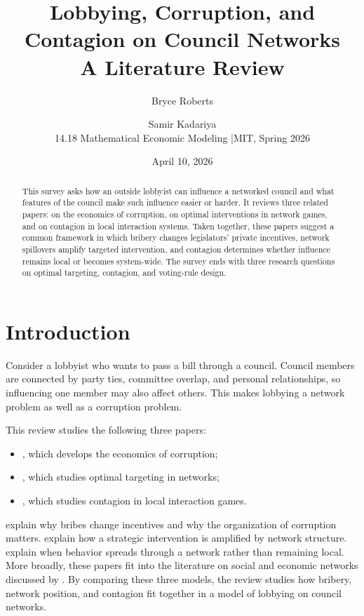 \documentclass[11pt,letterpaper]{article}
\title{\textbf{Lobbying, Corruption, and Contagion on Council Networks}\\{\small \textbf{A Literature Review}}}
\author{Bryce Roberts  \and Samir Kadariya \\[0.5em]
\small 14.18 Mathematical Economic Modeling \quad|\quad MIT, Spring 2026}
\date{April 10, 2026}
\begin{document}
\maketitle

\begin{abstract}
This survey asks how an outside lobbyist can influence a networked council and what features of the council make such influence easier or harder. It reviews three related papers: \citet{shleifer1993} on the economics of corruption, \citet{galeotti2020} on optimal interventions in network games, and \citet{morris2000} on contagion in local interaction systems. Taken together, these papers suggest a common framework in which bribery changes legislators' private incentives, network spillovers amplify targeted intervention, and contagion determines whether influence remains local or becomes system-wide. The survey ends with three research questions on optimal targeting, contagion, and voting-rule design.
\end{abstract}

\section*{Introduction}

Consider a lobbyist who wants to pass a bill through a council. Council members are connected by party ties, committee overlap, and personal relationships, so influencing one member may also affect others. This makes lobbying a network problem as well as a corruption problem.

This review studies the following three papers:
\begin{itemize}
    \item \citet{shleifer1993}, which develops the economics of corruption;
    \item \citet{galeotti2020}, which studies optimal targeting in networks;
    \item \citet{morris2000}, which studies contagion in local interaction games.
\end{itemize}

\citet{shleifer1993} explain why bribes change incentives and why the organization of corruption matters. \citet{galeotti2020} explain how a strategic intervention is amplified by network structure. \citet{morris2000} explain when behavior spreads through a network rather than remaining local. More broadly, these papers fit into the literature on social and economic networks discussed by \citet{jackson2008}. By comparing these three models, the review studies how bribery, network position, and contagion fit together in a model of lobbying on council networks.
\end{document}
